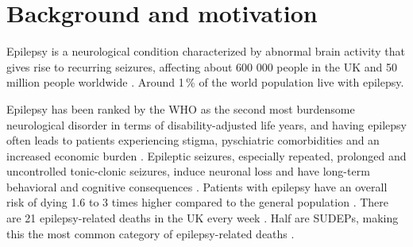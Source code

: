 \section{Background and motivation}

Epilepsy is a neurological condition characterized by abnormal brain activity that gives rise to recurring seizures, affecting about 600 000 people in the UK and 50 million people worldwide \cite{nice_epilepsies_2012,fiest_prevalence_2017}.
Around 1\,\% of the world population live with epilepsy.

Epilepsy has been ranked by the \ac{WHO} as the second most burdensome neurological disorder in terms of disability-adjusted life years, and
having epilepsy often leads to patients experiencing stigma, pyschiatric comorbidities and an increased economic burden \cite{fiest_prevalence_2017}.
Epileptic seizures, especially repeated, prolonged and uncontrolled tonic-clonic seizures, induce neuronal loss and have long-term behavioral and cognitive consequences \cite{sutula_epileptic_2003}.
Patients with epilepsy have an overall risk of dying 1.6 to 3 times higher compared to the general population \cite{forsgren_mortality_2005}.
There are 21 epilepsy-related deaths in the UK every week%
.
Half are \acp{SUDEP},  %
making this the most common category of epilepsy-related deaths \cite{devinsky_sudden_2016}.





